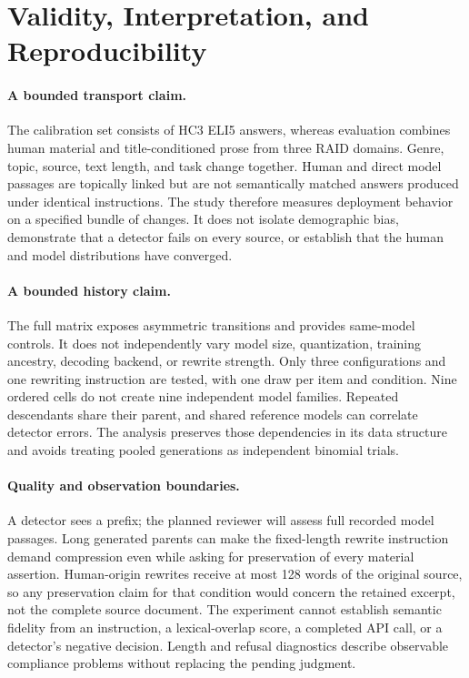 \section{Validity, Interpretation, and Reproducibility}
\paragraph{A bounded transport claim.}
The calibration set consists of HC3 ELI5 answers, whereas evaluation combines human material and title-conditioned prose from three RAID domains. Genre, topic, source, text length, and task change together. Human and direct model passages are topically linked but are not semantically matched answers produced under identical instructions. The study therefore measures deployment behavior on a specified bundle of changes. It does not isolate demographic bias, demonstrate that a detector fails on every source, or establish that the human and model distributions have converged.

\paragraph{A bounded history claim.}
The full matrix exposes asymmetric transitions and provides same-model controls. It does not independently vary model size, quantization, training ancestry, decoding backend, or rewrite strength. Only three configurations and one rewriting instruction are tested, with one draw per item and condition. Nine ordered cells do not create nine independent model families. Repeated descendants share their parent, and shared reference models can correlate detector errors. The analysis preserves those dependencies in its data structure and avoids treating pooled generations as independent binomial trials.

\paragraph{Quality and observation boundaries.}
A detector sees a prefix; the planned reviewer will assess full recorded model passages. Long generated parents can make the fixed-length rewrite instruction demand compression even while asking for preservation of every material assertion. Human-origin rewrites receive at most 128 words of the original source, so any preservation claim for that condition would concern the retained excerpt, not the complete source document. The experiment cannot establish semantic fidelity from an instruction, a lexical-overlap score, a completed API call, or a detector's negative decision. Length and refusal diagnostics describe observable compliance problems without replacing the pending judgment.

